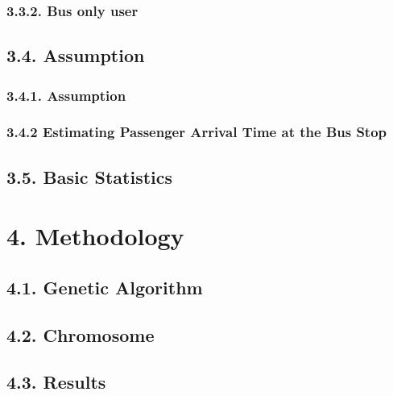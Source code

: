 \documentclass[
]{article}
\begin{document}
\hypertarget{bus-only-user}{%
\subsubsection{3.3.2. Bus only user}\label{bus-only-user}}

\hypertarget{assumption}{%
\subsection{3.4. Assumption}\label{assumption}}

\hypertarget{assumption-1}{%
\subsubsection{3.4.1. Assumption}\label{assumption-1}}

\hypertarget{estimating-passenger-arrival-time-at-the-bus-stop}{%
\subsubsection{3.4.2 Estimating Passenger Arrival Time at the Bus
Stop}\label{estimating-passenger-arrival-time-at-the-bus-stop}}

\hypertarget{basic-statistics}{%
\subsection{3.5. Basic Statistics}\label{basic-statistics}}

\hypertarget{methodology}{%
\section{4. Methodology}\label{methodology}}

\hypertarget{genetic-algorithm}{%
\subsection{4.1. Genetic Algorithm}\label{genetic-algorithm}}

\hypertarget{chromosome}{%
\subsection{4.2. Chromosome}\label{chromosome}}

\hypertarget{results}{%
\subsection{4.3. Results}\label{results}}
\end{document}
